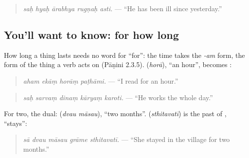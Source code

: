 \begin{quote}
\textbf{    }
\end{quote}

\begin{quote}
\emph{saḥ hyaḥ ārabhya rugṇaḥ asti.} — \textquotedblleft{}He has been ill since yesterday.\textquotedblright{}
\end{quote}

\subsection*{You'll want to know: for how long}
How long a thing lasts needs no word for \textquotedblleft{}for\textquotedblright{}: the time takes the \emph{-am} form, the form of the thing a verb acts on (Pāṇini 2.3.5). \textbf{} (\emph{horā}), \textquotedblleft{}an hour\textquotedblright{}, becomes \textbf{}:

\begin{quote}
\textbf{   }
\end{quote}

\begin{quote}
\emph{aham ekāṃ horāṃ paṭhāmi.} — \textquotedblleft{}I read for an hour.\textquotedblright{}
\end{quote}

\begin{quote}
\textbf{    }
\end{quote}

\begin{quote}
\emph{saḥ sarvaṃ dinaṃ kāryaṃ karoti.} — \textquotedblleft{}He works the whole day.\textquotedblright{}
\end{quote}

For two, the dual: \textbf{ } (\emph{dvau māsau}), \textquotedblleft{}two months\textquotedblright{}. \textbf{} (\emph{sthitavatī}) is the past of \textbf{}, \textquotedblleft{}stays\textquotedblright{}:

\begin{quote}
\textbf{    }
\end{quote}

\begin{quote}
\emph{sā dvau māsau grāme sthitavatī.} — \textquotedblleft{}She stayed in the village for two months.\textquotedblright{}
\end{quote}

